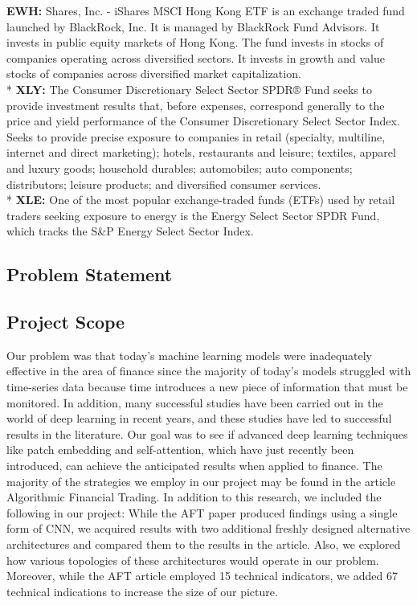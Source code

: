 \documentclass[]{article}
\begin{document}
\textbf{EWH:} Shares, Inc. - iShares MSCI Hong Kong ETF is an exchange traded fund launched by BlackRock, Inc. It is managed by BlackRock Fund Advisors. It invests in public equity markets of Hong Kong. The fund invests in stocks of companies operating across diversified sectors. It invests in growth and value stocks of companies across diversified market capitalization. \vspace{0.1cm}\\*
\textbf{XLY:} The Consumer Discretionary Select Sector SPDR® Fund seeks to provide investment results that, before expenses, correspond generally to the price and yield performance of the Consumer Discretionary Select Sector Index. Seeks to provide precise exposure to companies in retail (specialty, multiline, internet and direct marketing); hotels, restaurants and leisure; textiles, apparel and luxury goods; household durables; automobiles; auto components; distributors; leisure products; and diversified consumer services. \vspace{0.1cm}\\*
\textbf{XLE:} One of the most popular exchange-traded funds (ETFs) used by retail traders seeking exposure to energy is the Energy Select Sector SPDR Fund, which tracks the S\&P Energy Select Sector Index.
\noindent
\begin{center}
    \item\section{Problem Statement}
\end{center}
\subsection{Project Scope}
Our problem was that today's machine learning models were inadequately effective in the area of finance since the majority of today's models struggled with time-series data because time introduces a new piece of information that must be monitored. In addition, many successful studies have been carried out in the world of deep learning in recent years, and these studies have led to successful results in the literature. Our goal was to see if advanced deep learning techniques like patch embedding and self-attention, which have just recently been introduced, can achieve the anticipated results when applied to finance.
The majority of the strategies we employ in our project may be found in the article Algorithmic Financial Trading. In addition to this research, we included the following in our project: While the AFT paper produced findings using a single form of CNN, we acquired results with two additional freshly designed alternative architectures and compared them to the results in the article. Also, we explored how various topologies of these architectures would operate in our problem. Moreover, while the AFT article employed 15 technical indicators, we added 67 technical indications to increase the size of our picture.
\end{document}
